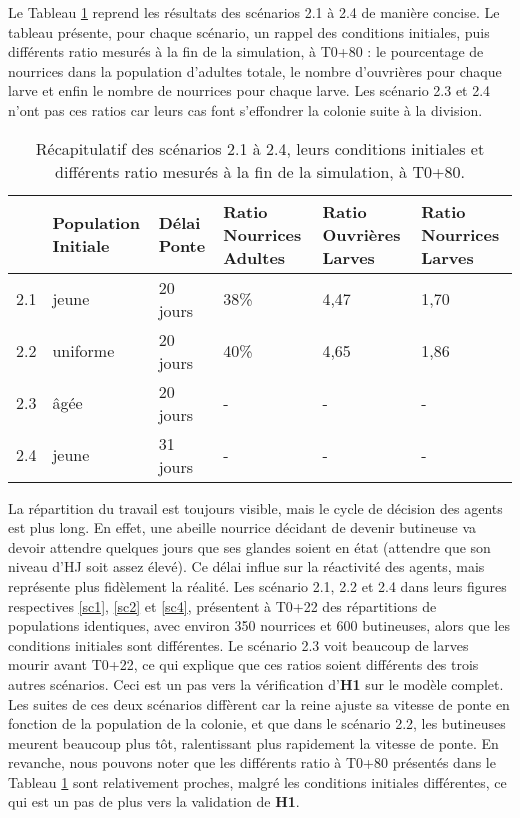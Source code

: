 		Le Tableau \ref{TabComplet} reprend les résultats des scénarios 2.1 à 2.4 de manière concise. Le tableau présente, pour chaque scénario, un rappel des conditions initiales, puis différents ratio mesurés à la fin de la simulation, à T0+80 : le pourcentage de nourrices dans la population d'adultes totale, le nombre d'ouvrières pour chaque larve et enfin le nombre de nourrices pour chaque larve. Les scénario 2.3 et 2.4 n'ont pas ces ratios car leurs cas font s'effondrer la colonie suite à la division.
		\begin{table}
		\centering
		\begin{tabularx}{\textwidth}{l|p{2cm}|p{1.5cm}|X|X|X}
    	& Population \newline Initiale & Délai Ponte & Ratio Nourrices Adultes & Ratio Ouvrières Larves & Ratio Nourrices Larves\\
   		\hline
   		2.1 & jeune & 20 jours & 38\% & 4,47 & 1,70 \\
   		2.2 & uniforme & 20 jours & 40\% & 4,65 & 1,86 \\
   		2.3 & âgée & 20 jours &-&-&-\\
   		2.4 & jeune & 31 jours &-&-&-\\
		\end{tabularx}	
		\caption{Récapitulatif des scénarios 2.1 à 2.4, leurs conditions initiales et différents ratio mesurés à la fin de la simulation, à T0+80.}	
   		\label{TabComplet}
	\end{table}	
		
		
		La répartition du travail est toujours visible, mais le cycle de décision des agents est plus long. En effet, une abeille nourrice décidant de devenir butineuse va devoir attendre quelques jours que ses glandes soient en état (attendre que son niveau d'HJ soit assez élevé). Ce délai influe sur la réactivité des agents, mais représente plus fidèlement la réalité. Les scénario 2.1, 2.2 et 2.4 dans leurs figures respectives \ref{sc1}, \ref{sc2} et \ref{sc4}, présentent à T0+22 des répartitions de populations identiques, avec environ 350 nourrices et 600 butineuses, alors que les conditions initiales sont différentes. Le scénario 2.3 voit beaucoup de larves mourir avant T0+22, ce qui explique que ces ratios soient différents des trois autres scénarios. Ceci est un pas vers la vérification d'\textbf{H1} sur le modèle complet. Les suites de ces deux scénarios diffèrent car la reine ajuste sa vitesse de ponte en fonction de la population de la colonie, et que dans le scénario 2.2, les butineuses meurent beaucoup plus tôt, ralentissant plus rapidement la vitesse de ponte. En revanche, nous pouvons noter que les différents ratio à T0+80 présentés dans le Tableau \ref{TabComplet} sont relativement proches, malgré les conditions initiales différentes, ce qui est un pas de plus vers la validation de \textbf{H1}.
		
